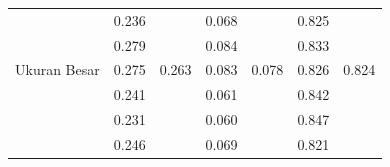 \documentclass[conference]{IEEEtran}
\begin{document}
\begin{table}[]
\begin{tabular}{|l|cc|cc|cc|}
                                                      & \multicolumn{1}{c|}{\cellcolor[HTML]{FFFFFF}0.236} & \cellcolor[HTML]{FFFFFF}                         & \multicolumn{1}{c|}{\cellcolor[HTML]{FFFFFF}0.068} & \cellcolor[HTML]{FFFFFF}                           & \multicolumn{1}{c|}{\cellcolor[HTML]{FFFFFF}0.825} & \cellcolor[HTML]{FFFFFF}                        \\ \cline{2-2} \cline{4-4} \cline{6-6}
                                                      & \multicolumn{1}{c|}{\cellcolor[HTML]{FFFFFF}0.279} & \cellcolor[HTML]{FFFFFF}                         & \multicolumn{1}{c|}{\cellcolor[HTML]{FFFFFF}0.084} & \cellcolor[HTML]{FFFFFF}                           & \multicolumn{1}{c|}{\cellcolor[HTML]{FFFFFF}0.833} & \cellcolor[HTML]{FFFFFF}                        \\ \cline{2-2} \cline{4-4} \cline{6-6}
  \multirow{-5}{*}{Ukuran Besar}             & \multicolumn{1}{c|}{\cellcolor[HTML]{FFFFFF}0.275} & \multirow{-5}{*}{\cellcolor[HTML]{FFFFFF}0.263} & \multicolumn{1}{c|}{\cellcolor[HTML]{FFFFFF}0.083} & \multirow{-5}{*}{\cellcolor[HTML]{FFFFFF}0.078} & \multicolumn{1}{c|}{\cellcolor[HTML]{FFFFFF}0.826} & \multirow{-5}{*}{\cellcolor[HTML]{FFFFFF}0.824} \\ \hline
                                                      & \multicolumn{1}{c|}{\cellcolor[HTML]{FFFFFF}0.241} & \cellcolor[HTML]{FFFFFF}                         & \multicolumn{1}{c|}{\cellcolor[HTML]{FFFFFF}0.061} & \cellcolor[HTML]{FFFFFF}                           & \multicolumn{1}{c|}{\cellcolor[HTML]{FFFFFF}0.842} & \cellcolor[HTML]{FFFFFF}                        \\ \cline{2-2} \cline{4-4} \cline{6-6}
                                                      & \multicolumn{1}{c|}{\cellcolor[HTML]{FFFFFF}0.231} & \cellcolor[HTML]{FFFFFF}                         & \multicolumn{1}{c|}{\cellcolor[HTML]{FFFFFF}0.060}  & \cellcolor[HTML]{FFFFFF}                           & \multicolumn{1}{c|}{\cellcolor[HTML]{FFFFFF}0.847} & \cellcolor[HTML]{FFFFFF}                        \\ \cline{2-2} \cline{4-4} \cline{6-6}
                                                      & \multicolumn{1}{c|}{\cellcolor[HTML]{FFFFFF}0.246} & \cellcolor[HTML]{FFFFFF}                         & \multicolumn{1}{c|}{\cellcolor[HTML]{FFFFFF}0.069} & \cellcolor[HTML]{FFFFFF}                           & \multicolumn{1}{c|}{\cellcolor[HTML]{FFFFFF}0.821} & \cellcolor[HTML]{FFFFFF}                        \\ \cline{2-2} \cline{4-4} \cline{6-6}

\end{tabular}
\end{table}
\end{document}
